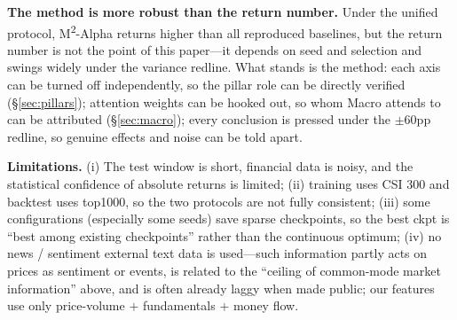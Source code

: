 \documentclass[a4paper,11pt]{article}
\newcommand{\msqa}{\texorpdfstring{M\textsuperscript{2}-Alpha}{M2-Alpha}} %
\begin{document}
\textbf{The method is more robust than the return number.} Under the
unified protocol, \msqa{} returns higher than all reproduced baselines, but the
return number is not the point of this paper---it depends on seed and selection
and swings widely under the variance redline. What stands is the method: each
axis can be turned off independently, so the pillar role can be directly
verified (\S\ref{sec:pillars}); attention weights can be hooked out, so whom
Macro attends to can be attributed (\S\ref{sec:macro}); every conclusion is
pressed under the $\pm60$pp redline, so genuine effects and noise can be
told apart.

\textbf{Limitations.} (i) The test window is short, financial data is
noisy, and the statistical confidence of absolute returns is limited;
(ii) training uses CSI 300 and backtest uses top1000, so the two protocols are
not fully consistent; (iii) some configurations (especially some seeds) save
sparse checkpoints, so the best ckpt is ``best among existing checkpoints''
rather than the continuous optimum; (iv) no news / sentiment external text data
is used---such information partly acts on prices as sentiment or events, is
related to the ``ceiling of common-mode market information'' above, and is
often already laggy when made public; our features use only price-volume $+$
fundamentals $+$ money flow.

\end{document}
